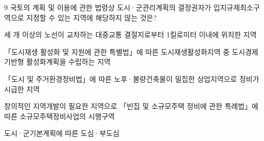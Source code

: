 \begin{question}{9}
국토의 계획 및 이용에 관한 법령상 도시·군관리계획의 결정권자가 입지규제최소구역으로 지정할 수 있는 지역에 해당하지 않는 것은?
\begin{choices}
  \item 세 개 이상의 노선이 교차하는 대중교통 결절지로부터 1킬로미터 이내에 위치한 지역
  \item 「도시재생 활성화 및 지원에 관한 특별법」에 따른 도시재생활성화지역 중 도시경제기반형 활성화계획을 수립하는 지역
  \item 「도시 및 주거환경정비법」에 따른 노후·불량건축물이 밀집한 상업지역으로 정비가 시급한 지역
  \item 창의적인 지역개발이 필요한 지역으로 「빈집 및 소규모주택 정비에 관한 특례법」에 따른 소규모주택정비사업의 시행구역
  \item 도시·군기본계획에 따른 도심·부도심
\end{choices}
\end{question}
